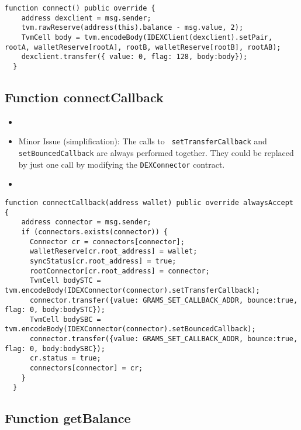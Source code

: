 \begin{lstlisting}[firstnumber=149]
  function connect() public override {
    address dexclient = msg.sender;
    tvm.rawReserve(address(this).balance - msg.value, 2);
    TvmCell body = tvm.encodeBody(IDEXClient(dexclient).setPair, rootA, walletReserve[rootA], rootB, walletReserve[rootB], rootAB);
    dexclient.transfer({ value: 0, flag: 128, body:body});
  }
\end{lstlisting}

\subsection{Function connectCallback}

\begin{itemize}
\item {}
\item Minor Issue (simplification): The calls to {\tt
  setTransferCallback} and {\tt setBouncedCallback} are always
  performed together. They could be replaced by just one call by
  modifying the {\tt DEXConnector} contract.
\item \issueEncodeBody
\end{itemize}

\begin{lstlisting}[firstnumber=132]
  function connectCallback(address wallet) public override alwaysAccept {
    address connector = msg.sender;
    if (connectors.exists(connector)) {
      Connector cr = connectors[connector];
      walletReserve[cr.root_address] = wallet;
      syncStatus[cr.root_address] = true;
      rootConnector[cr.root_address] = connector;
      TvmCell bodySTC = tvm.encodeBody(IDEXConnector(connector).setTransferCallback);
      connector.transfer({value: GRAMS_SET_CALLBACK_ADDR, bounce:true, flag: 0, body:bodySTC});
      TvmCell bodySBC = tvm.encodeBody(IDEXConnector(connector).setBouncedCallback);
      connector.transfer({value: GRAMS_SET_CALLBACK_ADDR, bounce:true, flag: 0, body:bodySBC});
      cr.status = true;
      connectors[connector] = cr;
    }
  }
\end{lstlisting}

\subsection{Function getBalance}

